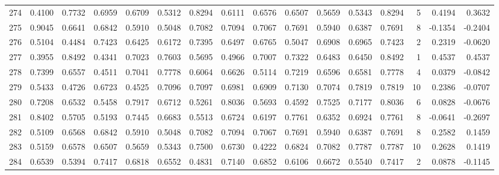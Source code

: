 \begin{tabular}{lrrrrrrrrrrrrrrr}
274 &      0.4100 &  0.7732 &  0.6959 &  0.6709 &  0.5312 &  0.8294 &  0.6111 &  0.6576 &  0.6507 &  0.5659 &   0.5343 &     0.8294 &      5 &                    0.4194 &                     0.3632 \\
275 &      0.9045 &  0.6641 &  0.6842 &  0.5910 &  0.5048 &  0.7082 &  0.7094 &  0.7067 &  0.7691 &  0.5940 &   0.6387 &     0.7691 &      8 &                   -0.1354 &                    -0.2404 \\
276 &      0.5104 &  0.4484 &  0.7423 &  0.6425 &  0.6172 &  0.7395 &  0.6497 &  0.6765 &  0.5047 &  0.6908 &   0.6965 &     0.7423 &      2 &                    0.2319 &                    -0.0620 \\
277 &      0.3955 &  0.8492 &  0.4341 &  0.7023 &  0.7603 &  0.5695 &  0.4966 &  0.7007 &  0.7322 &  0.6483 &   0.6450 &     0.8492 &      1 &                    0.4537 &                     0.4537 \\
278 &      0.7399 &  0.6557 &  0.4511 &  0.7041 &  0.7778 &  0.6064 &  0.6626 &  0.5114 &  0.7219 &  0.6596 &   0.6581 &     0.7778 &      4 &                    0.0379 &                    -0.0842 \\
279 &      0.5433 &  0.4726 &  0.6723 &  0.4525 &  0.7096 &  0.7097 &  0.6981 &  0.6909 &  0.7130 &  0.7074 &   0.7819 &     0.7819 &     10 &                    0.2386 &                    -0.0707 \\
280 &      0.7208 &  0.6532 &  0.5458 &  0.7917 &  0.6712 &  0.5261 &  0.8036 &  0.5693 &  0.4592 &  0.7525 &   0.7177 &     0.8036 &      6 &                    0.0828 &                    -0.0676 \\
281 &      0.8402 &  0.5705 &  0.5193 &  0.7445 &  0.6683 &  0.5513 &  0.6724 &  0.6197 &  0.7761 &  0.6352 &   0.6924 &     0.7761 &      8 &                   -0.0641 &                    -0.2697 \\
282 &      0.5109 &  0.6568 &  0.6842 &  0.5910 &  0.5048 &  0.7082 &  0.7094 &  0.7067 &  0.7691 &  0.5940 &   0.6387 &     0.7691 &      8 &                    0.2582 &                     0.1459 \\
283 &      0.5159 &  0.6578 &  0.6507 &  0.5659 &  0.5343 &  0.7500 &  0.6730 &  0.4222 &  0.6824 &  0.7082 &   0.7787 &     0.7787 &     10 &                    0.2628 &                     0.1419 \\
284 &      0.6539 &  0.5394 &  0.7417 &  0.6818 &  0.6552 &  0.4831 &  0.7140 &  0.6852 &  0.6106 &  0.6672 &   0.5540 &     0.7417 &      2 &                    0.0878 &                    -0.1145 \\

\end{tabular}
